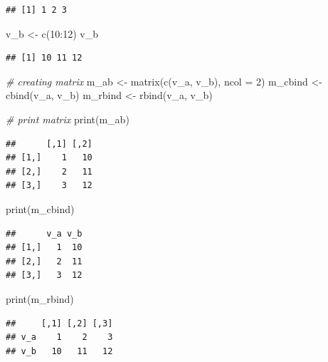 \documentclass[
  12pt,
  oneside]{book}
\newenvironment{Shaded}{\begin{snugshade}}{\end{snugshade}}
\newcommand{\AttributeTok}[1]{\textcolor[rgb]{0.77,0.63,0.00}{#1}}
\newcommand{\CommentTok}[1]{\textcolor[rgb]{0.56,0.35,0.01}{\textit{#1}}}
\newcommand{\DecValTok}[1]{\textcolor[rgb]{0.00,0.00,0.81}{#1}}
\newcommand{\FunctionTok}[1]{\textcolor[rgb]{0.00,0.00,0.00}{#1}}
\newcommand{\NormalTok}[1]{#1}
\newcommand{\OtherTok}[1]{\textcolor[rgb]{0.56,0.35,0.01}{#1}}
\newcommand{\SpecialCharTok}[1]{\textcolor[rgb]{0.00,0.00,0.00}{#1}}
\theoremstyle{definition}
\theoremstyle{definition}
\theoremstyle{definition}
\theoremstyle{definition}
\theoremstyle{remark}
\begin{document}
\begin{verbatim}
## [1] 1 2 3
\end{verbatim}

\begin{Shaded}
\begin{Highlighting}[]
\NormalTok{v\_b }\OtherTok{\textless{}{-}} \FunctionTok{c}\NormalTok{(}\DecValTok{10}\SpecialCharTok{:}\DecValTok{12}\NormalTok{)}
\NormalTok{v\_b}
\end{Highlighting}
\end{Shaded}

\begin{verbatim}
## [1] 10 11 12
\end{verbatim}

\begin{Shaded}
\begin{Highlighting}[]
\CommentTok{\# creating matrix}
\NormalTok{m\_ab }\OtherTok{\textless{}{-}} \FunctionTok{matrix}\NormalTok{(}\FunctionTok{c}\NormalTok{(v\_a, v\_b), }\AttributeTok{ncol =} \DecValTok{2}\NormalTok{)}
\NormalTok{m\_cbind }\OtherTok{\textless{}{-}} \FunctionTok{cbind}\NormalTok{(v\_a, v\_b)}
\NormalTok{m\_rbind }\OtherTok{\textless{}{-}} \FunctionTok{rbind}\NormalTok{(v\_a, v\_b)}

\CommentTok{\# print matrix}
\FunctionTok{print}\NormalTok{(m\_ab)}
\end{Highlighting}
\end{Shaded}

\begin{verbatim}
##      [,1] [,2]
## [1,]    1   10
## [2,]    2   11
## [3,]    3   12
\end{verbatim}

\begin{Shaded}
\begin{Highlighting}[]
\FunctionTok{print}\NormalTok{(m\_cbind)}
\end{Highlighting}
\end{Shaded}

\begin{verbatim}
##      v_a v_b
## [1,]   1  10
## [2,]   2  11
## [3,]   3  12
\end{verbatim}

\begin{Shaded}
\begin{Highlighting}[]
\FunctionTok{print}\NormalTok{(m\_rbind)}
\end{Highlighting}
\end{Shaded}

\begin{verbatim}
##     [,1] [,2] [,3]
## v_a    1    2    3
## v_b   10   11   12
\end{verbatim}
\end{document}
